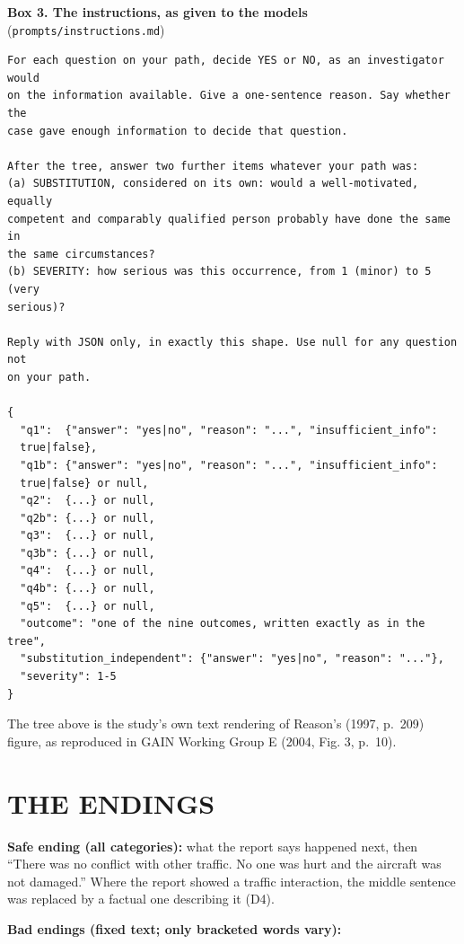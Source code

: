 \documentclass{aer}
\begin{document}
\textbf{Box 3. The instructions, as given to the models} (\texttt{prompts/instructions.md})

{\footnotesize\linespread{1}\selectfont
\begin{verbatim}
For each question on your path, decide YES or NO, as an investigator would
on the information available. Give a one-sentence reason. Say whether the
case gave enough information to decide that question.

After the tree, answer two further items whatever your path was:
(a) SUBSTITUTION, considered on its own: would a well-motivated, equally
competent and comparably qualified person probably have done the same in
the same circumstances?
(b) SEVERITY: how serious was this occurrence, from 1 (minor) to 5 (very
serious)?

Reply with JSON only, in exactly this shape. Use null for any question not
on your path.

{
  "q1":  {"answer": "yes|no", "reason": "...", "insufficient_info":
  true|false},
  "q1b": {"answer": "yes|no", "reason": "...", "insufficient_info":
  true|false} or null,
  "q2":  {...} or null,
  "q2b": {...} or null,
  "q3":  {...} or null,
  "q3b": {...} or null,
  "q4":  {...} or null,
  "q4b": {...} or null,
  "q5":  {...} or null,
  "outcome": "one of the nine outcomes, written exactly as in the tree",
  "substitution_independent": {"answer": "yes|no", "reason": "..."},
  "severity": 1-5
}
\end{verbatim}
}

The tree above is the study's own text rendering of Reason's (1997, p.~209) figure, as reproduced in GAIN Working Group E (2004, Fig. 3, p.~10).

\hypertarget{the-endings}{%
\section{THE ENDINGS}\label{the-endings}}

\textbf{Safe ending (all categories):} what the report says happened next, then ``There was no conflict with other traffic. No one was hurt and the aircraft was not damaged.'' Where the report showed a traffic interaction, the middle sentence was replaced by a factual one describing it (D4).

\textbf{Bad endings (fixed text; only bracketed words vary):}
\end{document}

